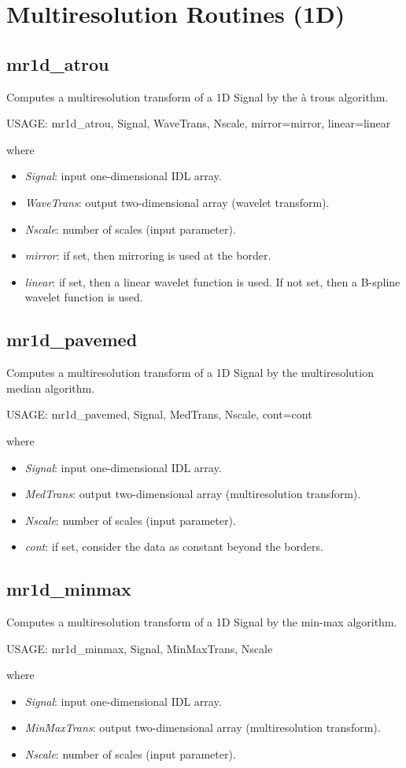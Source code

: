  

\section{Multiresolution Routines (1D)}
\subsection{mr1d\_atrou}
Computes a multiresolution transform of a 1D Signal by the
\`a trous algorithm.
{\bf
\begin{center}
     USAGE: mr1d\_atrou, Signal, WaveTrans, Nscale, mirror=mirror, linear=linear
\end{center}}
where 
\begin{itemize}
\item {\em Signal}: input one-dimensional IDL array.
\item {\em WaveTrans}: output two-dimensional array (wavelet transform).
\item {\em Nscale}: number of scales (input parameter).
\item {\em mirror}: if set, then mirroring is used at the border. 
\item {\em linear}: if set, then a linear wavelet function is used.
If not set, then a B-spline wavelet function is used.
\end{itemize}
 
\subsection{mr1d\_pavemed}
Computes a multiresolution transform of a 1D Signal by the
multiresolution median algorithm.
{\bf
\begin{center}
     USAGE: mr1d\_pavemed, Signal, MedTrans, Nscale, cont=cont
\end{center}}
where 
\begin{itemize}
\item {\em Signal}: input one-dimensional IDL array.
\item {\em MedTrans}: output two-dimensional array (multiresolution transform).
\item {\em Nscale}: number of scales (input parameter).
\item {\em cont}: if set, consider the data as constant beyond
the borders. 
\end{itemize}
 
\subsection{mr1d\_minmax}
Computes a multiresolution transform of a 1D Signal by the
min-max algorithm.
{\bf
\begin{center}
     USAGE: mr1d\_minmax, Signal, MinMaxTrans, Nscale
\end{center}}
where 
\begin{itemize}
\item {\em Signal}: input one-dimensional IDL array.
\item {\em MinMaxTrans}: output two-dimensional array 
(multiresolution transform).
\item {\em Nscale}: number of scales (input parameter).
\end{itemize}

